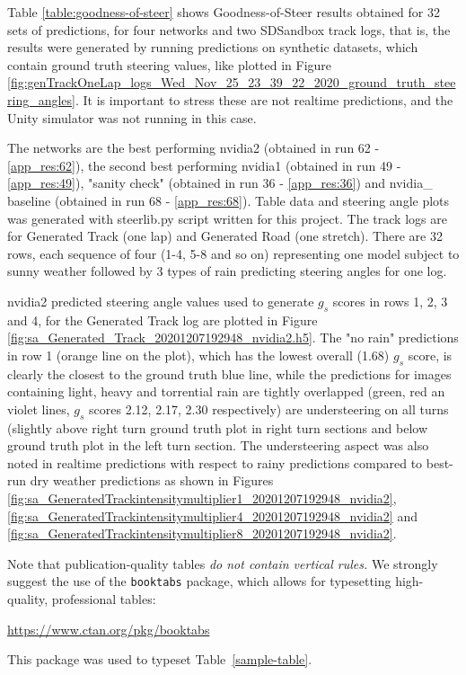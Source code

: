 Table \ref{table:goodness-of-steer} shows Goodness-of-Steer results obtained for 32 sets of predictions, for four networks and two SDSandbox track logs, that is, the results were generated by running predictions on synthetic datasets, which contain ground truth steering values, like plotted in Figure \ref{fig:genTrackOneLap_logs_Wed_Nov_25_23_39_22_2020_ground_truth_steering_angles}. It is important to stress these are not realtime predictions, and the Unity simulator was not running in this case.

The networks are the best performing nvidia2 (obtained in run 62 - \ref{app_res:62}), the second best performing nvidia1 (obtained in run 49 - \ref{app_res:49}), "sanity check" (obtained in run 36 - \ref{app_res:36}) and nvidia\_ baseline (obtained in run 68 - \ref{app_res:68}). Table data and steering angle plots was generated with steerlib.py script written for this project. The track logs are for Generated Track (one lap) and Generated Road (one stretch). There are 32 rows, each sequence of four (1-4, 5-8 and so on) representing one model subject to sunny weather followed by 3 types of rain predicting steering angles for one log. 

nvidia2 predicted steering angle values used to generate $g_s$ scores in rows 1, 2, 3 and 4, for the Generated Track log are plotted in Figure  \ref{fig:sa_Generated_Track_20201207192948_nvidia2.h5}. The "no rain" predictions in row 1 (orange line on the plot), which has the lowest overall (1.68) $g_s$ score, is clearly the closest to the ground truth blue line, while the predictions for images containing light, heavy and torrential rain are tightly overlapped (green, red an violet lines, $g_s$ scores 2.12, 2.17, 2.30 respectively) are understeering on all turns (slightly above right turn ground truth plot in right turn sections and below ground truth plot in the left turn section. The understeering aspect was also noted in realtime predictions with respect to rainy predictions compared to best-run dry weather predictions as shown in Figures \ref{fig:sa_GeneratedTrackintensitymultiplier1_20201207192948_nvidia2}, 
\ref{fig:sa_GeneratedTrackintensitymultiplier4_20201207192948_nvidia2} and 
\ref{fig:sa_GeneratedTrackintensitymultiplier8_20201207192948_nvidia2}.

Note that publication-quality tables \emph{do not contain vertical rules.} We
strongly suggest the use of the \verb+booktabs+ package, which allows for
typesetting high-quality, professional tables:
\begin{center}
  \url{https://www.ctan.org/pkg/booktabs}
\end{center}
This package was used to typeset Table~\ref{sample-table}.

